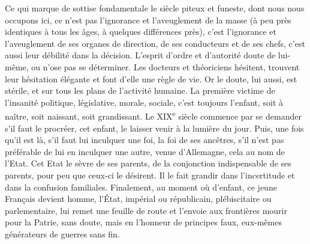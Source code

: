 \documentclass[french,twoside]{book} %
\begin{document}
Ce qui marque de sottise fondamentale le siècle piteux et funeste, dont nous nous occupons ici, ce n’est pas l’ignorance et l’aveuglement de la masse (à peu près identiques à tous les âges, à quelques différences près), c’est l’ignorance et l’aveuglement de ses organes de direction, de ses conducteurs et de ses chefs, c’est aussi leur débilité dans la décision. L’esprit d’ordre et d’autorité doute de lui-même, ou n’ose pas se déterminer. Les docteurs et théoriciens hésitent, trouvent leur hésitation élégante et font d’elle une règle de vie. Or le doute, lui aussi, est stérile, et sur tous les plans de l’activité humaine. La première victime de l’insanité politique, législative, morale, sociale, c’est toujours l’enfant, soit à naître, soit naissant, soit grandissant. Le XIX\textsuperscript{e} siècle commence par se demander s’il faut le procréer, cet enfant, le laisser venir à la lumière du jour. Puis, une fois qu’il est là, s’il faut lui inculquer une foi, la foi de ses ancêtres, s’il n’est pas préférable de lui en inculquer une autre, venue d’Allemagne, cela au nom de l’Etat. Cet Etat le sèvre de ses parents, de la conjonction indispensable de ses parents, pour peu que ceux-ci le désirent. Il le fait grandir dans l’incertitude et dans la confusion familiales. Finalement, au moment où d’enfant, ce jeune Français devient homme, l’État, impérial ou républicain, plébiscitaire ou parlementaire, lui remet une feuille de route et l’envoie aux frontières mourir pour la Patrie, sans doute, mais en l’honneur de principes faux, eux-mêmes générateurs de guerres sans fin.\par
\end{document}
